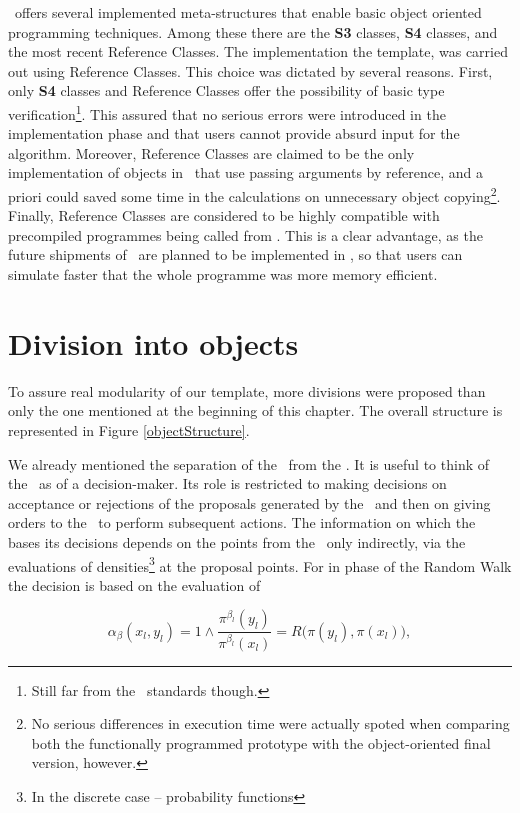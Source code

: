 \documentclass{book}
\begin{document}
\RR\, offers several implemented meta-structures that enable basic object oriented programming techniques. Among these there are the \textbf{S3} classes, \textbf{S4} classes, and the most recent Reference Classes. The implementation the template, was carried out using Reference Classes. This choice was dictated by several reasons. First, only \textbf{S4} classes and Reference Classes offer the possibility of basic type verification\footnote{Still far from the \Cpp\, standards though.}. This assured that no serious errors were introduced in the implementation phase and that users cannot provide absurd input for the algorithm. Moreover, Reference Classes are claimed to be the only implementation of objects in \RR\, that use passing arguments by reference, and a priori could saved some time in the calculations on unnecessary object copying\footnote{No serious differences in execution time were actually spoted when comparing both the functionally programmed prototype with the object-oriented final version, however.}. Finally, Reference Classes are considered to be highly compatible with \Cpp\, precompiled programmes being called from \RR. This is a clear advantage, as the future shipments of \ssimul\, are planned to be implemented in \Cpp, so that users can simulate faster that the whole programme was more memory efficient.   

\section{Division into objects}

To assure real modularity of our template, more divisions were proposed than only the one mentioned at the beginning of this chapter. The overall structure is represented in Figure \ref{objectStructure}.

We already mentioned the separation of the \algo\, from the \sspace. It is useful to think of the \algo\, as of a decision-maker. Its role is restricted to making decisions on acceptance or rejections of the proposals generated by the \sspace\, and then on giving orders to the \sspace\, to perform subsequent actions. The information on which the \algo\, bases its decisions depends on the points from the \sspace\, only indirectly, via the evaluations of densities\footnote{In the discrete case -- probability functions} at the proposal points. For in phase of the Random Walk the decision is based on the evaluation of 

\begin{equation*}
	\alpha_\beta(x_l , y_l) = 1 \wedge \frac{\pi^{\beta_l}(y_l)}{\pi^{\beta_l}(x_l)} = R\Big(\pi(y_l),\pi(x_l)\Big),
\end{equation*}
\end{document}
